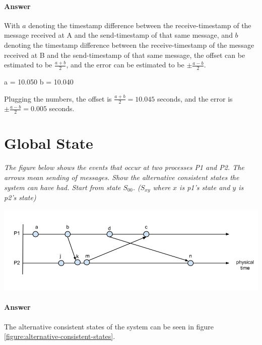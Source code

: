 \documentclass{article}
\newcommand{\singlequestion}[1]{\textit{#1}\bigskip}
\newcommand{\answer}{\paragraph{Answer}}
\begin{document}
\answer
With $ a $ denoting the timestamp difference between the receive-timestamp of the message received at A and the send-timestamp of that same message, and $ b $ denoting the timestamp difference between the receive-timestamp of the message received at B and the send-timestamp of that same message, the offset can be estimated to be $ \frac{a + b}{2} $, and the error can be estimated to be $ \pm \frac{a - b}{2} $.

a = 10.050
b = 10.040

Plugging the numbers, the offset is $ \frac{a + b}{2} = 10.045 $ seconds, and the error is $ \pm \frac{a - b}{2} = 0.005 $ seconds.

\section{Global State}

\singlequestion{The figure below shows the events that occur at two processes P1 and P2. The arrows mean sending of messages. Show the alternative consistent states the system can have had. Start from state $ S_{00} $. ($ S_{xy} $ where $ x $ is p1's state and $ y $ is p2's state)}

\includegraphics[width=\textwidth]{images/T3-3.png}

\answer
The alternative consistent states of the system can be seen in figure \ref{figure:alternative-consistent-states}.
\end{document}
